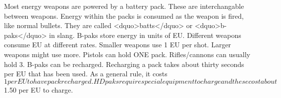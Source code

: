 Most energy weapons are powered by a battery pack.  These are interchangable between weapons.  Energy within the packs is consumed as the weapon is fired, like normal bullets.  They are called <dquo>batts</dquo> or <dquo>b-paks</dquo> in slang. B-paks store energy in units of EU.  Different weapons consume EU at different rates.  Smaller weapons use 1 EU per shot.  Larger weapons might use more.  Pistols can hold ONE pack.  Rifles/cannons can usually hold 3. B-paks can be recharged.  Recharging a pack takes about thirty seconds per EU that has been used.  As a general rule, it costs $1 per EU to have pack recharged.  HD paks require special equipment to charge and these cost about $1.50 per EU to charge.								